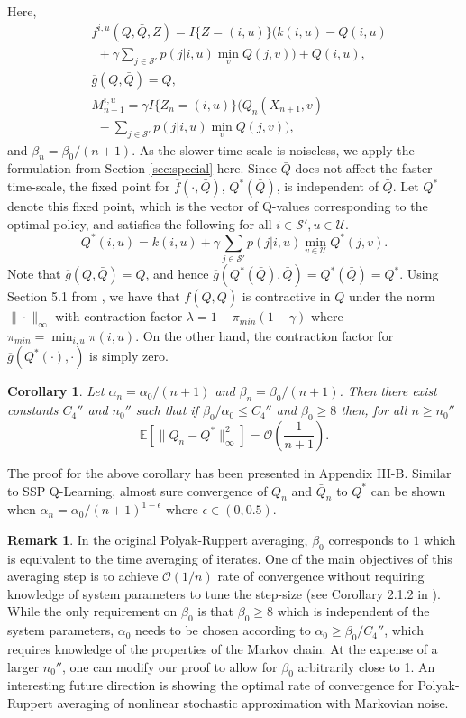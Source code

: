 \documentclass[letterpaper, 10 pt, conference]{ieeeconf}  %
\theoremstyle{definition}
\newtheorem{remark}{Remark}
\theoremstyle{plain}
\newtheorem{corollary}{Corollary}
\newcommand{\barf}{\overline{f}}
\newcommand{\barg}{\overline{g}}
\newcommand{\Qstar}{Q^*}
\newcommand{\Scal}{\mathcal{S}}
\newcommand{\UU}{\mathcal{U}}
\newcommand{\EE}{\mathbb{E}}
\begin{document}
Here,
\begin{align*}
    &f^{i,u}(Q, \bar{Q}, Z)=I\{Z=(i,u)\}\Big(k(i,u)-Q(i,u)\\
    &~~+\gamma \sum_{j\in \Scal'}p(j|i,u)\min_vQ(j,v)\Big)+Q(i,u),\\
    &\barg(Q, \bar{Q})=Q,\\
    &M_{n+1}^{i,u}=\gamma I\{Z_n=(i,u)\}\Big(Q_n(X_{n+1},v)\\
    &~~-\sum_{j\in\Scal'}p(j|i,u)\min_vQ(j,v)\Big),
\end{align*}
and $\beta_n=\beta_0/(n+1)$. As the slower time-scale is noiseless, we apply the formulation from Section \ref{sec:special} here. Since $\bar{Q}$ does not affect the faster time-scale, the fixed point for $\barf(\cdot,\bar{Q})$, $\Qstar(\bar{Q})$, is independent of $\bar{Q}$. Let $\Qstar$ denote this fixed point, which is the vector of Q-values corresponding to the optimal policy, and satisfies the following for all $i\in\Scal',u\in\UU$.
\begin{equation}\label{Qstar-polyak}
    \Qstar(i,u)=k(i,u)+\gamma\sum_{j\in\Scal'}p(j|i,u)\min_{v\in\UU}\Qstar(j,v).
\end{equation}
Note that $\barg(Q,\bar{Q})=Q$, and hence $\barg(\Qstar(\bar{Q}),\bar{Q})=\Qstar(\bar{Q})=\Qstar$. Using Section 5.1 from \cite{Chandak_conc}, we have that $\barf(Q,\bar{Q})$ is contractive in $Q$ under the norm $\|\cdot\|_\infty$ with contraction factor $\lambda=1-\pi_{min}(1-\gamma)$ where $\pi_{min}=\min_{i,u}\pi(i,u)$. On the other hand, the contraction factor for $\barg(\Qstar(\cdot),\cdot)$ is simply zero.

\begin{corollary}\label{coro:Q-polyak}
    Let $\alpha_n=\alpha_0/(n+1)$ and $\beta_n=\beta_0/(n+1)$. Then there exist constants $C_4''$ and $n_0''$ such that if $\beta_0/\alpha_0\leq C_4''$ and $\beta_0\geq 8$ then, for all $n\geq n_0''$ 
    $$\EE[\|\bar{Q}_n-\Qstar\|_{\infty}^2]=\mathcal{O}\left(\frac{1}{n+1}\right).$$
\end{corollary}
The proof for the above corollary has been presented in Appendix III-B. Similar to SSP Q-Learning, almost sure convergence of $Q_n$ and $\bar{Q}_n$ to $\Qstar$ can be shown when $\alpha_n=\alpha_0/(n+1)^{1-\epsilon}$ where $\epsilon\in(0,0.5)$.

\begin{remark}
In the original Polyak-Ruppert averaging, $\beta_0$ corresponds to $1$ which is equivalent to the time averaging of iterates. One of the main objectives of this averaging step is to achieve $\mathcal{O}(1/n)$ rate of convergence without requiring knowledge of system parameters to tune the step-size (see Corollary 2.1.2 in \cite{chen2024lyapunov}). While the only requirement on $\beta_0$ is that $\beta_0\geq 8$ which is independent of the system parameters, $\alpha_0$ needs to be chosen according to $\alpha_0\geq \beta_0/C_4''$, which requires knowledge of the properties of the Markov chain.
    At the expense of a larger $n_0''$, one can modify our proof to allow for $\beta_0$ arbitrarily close to 1. An interesting future direction is showing the optimal rate of convergence for Polyak-Ruppert averaging of nonlinear stochastic approximation with Markovian noise.     
\end{remark}
\end{document}
